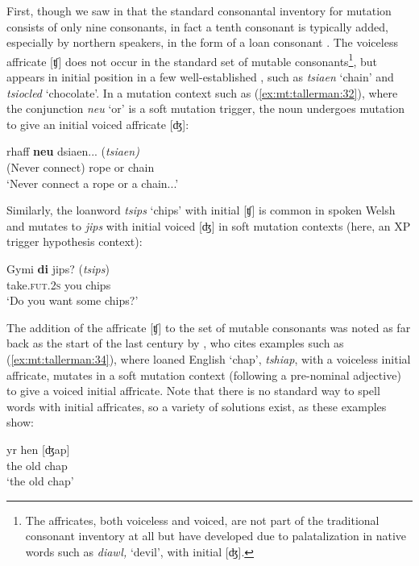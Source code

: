 \documentclass[output=paper,colorlinks,citecolor=brown]{langscibook}
\begin{document}
{First, though we saw in  that the standard consonantal inventory for mutation consists of only nine consonants, in fact a tenth consonant is typically added, especially by northern speakers, in the form of a loan consonant \citep{Griffen1974}. The voiceless affricate [ʧ] does not occur in the standard set of mutable consonants}\footnote{{The affricates, both voiceless and voiced, are not part of the traditional consonant inventory at all \citep{Hannahs2013} but have developed due to palatalization in native words such as} {\textit{diawl,} }{‘devil’, with initial [ʤ].}}{, but appears in initial position in a few well-established , such as} {\textit{tsiaen}}{ ‘chain’ and} {\textit{tsiocled}}{ ‘chocolate’. In a mutation context such as (\ref{ex:mt:tallerman:32}), where the conjunction} {\textit{neu}}{ ‘or’ is a soft mutation trigger, the noun undergoes mutation to give an initial voiced affricate [ʤ]:}

\ea\label{ex:mt:tallerman:32}
 rhaff \textbf{neu} dsiaen...  (\textit{tsiaen)}\\
{(Never connect)} rope or chain\\
\glt ‘Never connect a rope or a chain...’
\z

{Similarly, the loanword} {\textit{tsips}}{ ‘chips’ with initial [ʧ] is common in spoken Welsh and mutates to} {\textit{jips}}{ with initial voiced [ʤ] in  soft mutation contexts (here, an XP trigger hypothesis context):} 

\ea\label{ex:mt:tallerman:33}
\gll Gymi \textbf{di} jips?    ({\textit{tsips}})\\
take.\textsc{fut.2s} you chips\\
\glt ‘Do you want some chips?’
\z

{The addition of the affricate [ʧ] to the set of mutable consonants was noted as far back as the start of the last century by \citet{Fynes-Clinton1913}, who cites examples such as (\ref{ex:mt:tallerman:34}), where loaned English ‘chap’,} {\textit{tshiap}}{, with a voiceless initial affricate, mutates in a soft mutation context (following a pre-nominal adjective) to give a voiced initial affricate. Note that there is no standard way to spell words with initial affricates, so a variety of solutions exist, as these examples show:}

\ea\label{ex:mt:tallerman:34}
\gll yr hen [ʤap] \\
the old chap \\
\glt `the old chap'
\z
\end{document}
